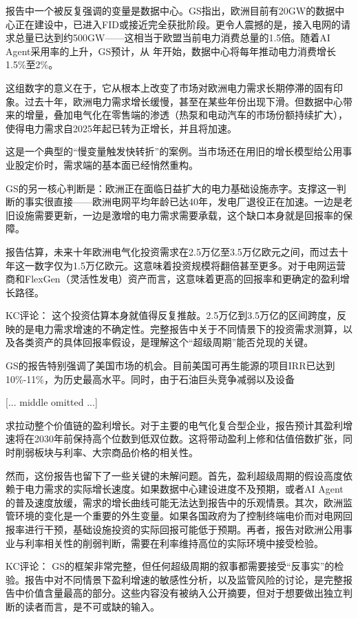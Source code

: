 \documentclass[11pt]{ctexart}
\begin{document}
报告中一个被反复强调的变量是数据中心。GS指出，欧洲目前有20GW的数据中心正在建设中，已进入FID或接近完全获批阶段。更令人震撼的是，接入电网的请求总量已达到约500GW——这相当于欧盟当前电力消费总量的1.5倍。随着AI Agent采用率的上升，GS预计，从 年开始，数据中心将每年推动电力消费增长1.5\%至2\%。

这组数字的意义在于，它从根本上改变了市场对欧洲电力需求长期停滞的固有印象。过去十年，欧洲电力需求增长缓慢，甚至在某些年份出现下滑。但数据中心带来的增量，叠加电气化在零售端的渗透（热泵和电动汽车的市场份额持续扩大），使得电力需求自2025年起已转为正增长，并且将加速。

这是一个典型的“慢变量触发快转折”的案例。当市场还在用旧的增长模型给公用事业股定价时，需求端的基本面已经悄然重构。

GS的另一核心判断是：欧洲正在面临日益扩大的电力基础设施赤字。支撑这一判断的事实很直接——欧洲电网平均年龄已达40年，发电厂退役正在加速。一边是老旧设施需要更新，一边是激增的电力需求需要承载，这个缺口本身就是回报率的保障。

报告估算，未来十年欧洲电气化投资需求在2.5万亿至3.5万亿欧元之间，而过去十年这一数字仅为1.5万亿欧元。这意味着投资规模将翻倍甚至更多。对于电网运营商和FlexGen（灵活性发电）资产而言，这意味着更高的回报率和更确定的盈利增长路径。

KC评论： 这个投资估算本身就值得反复推敲。2.5万亿到3.5万亿的区间跨度，反映的是电力需求增速的不确定性。完整报告中关于不同情景下的投资需求测算，以及各类资产的具体回报率假设，是理解这个“超级周期”能否兑现的关键。

GS的报告特别强调了美国市场的机会。目前美国可再生能源的项目IRR已达到10\%-11\%，为历史最高水平。同时，由于石油巨头竞争减弱以及设备

[... middle omitted ...]

求拉动整个价值链的盈利增长。对于主要的电气化复合型企业，报告预计其盈利增速将在2030年前保持高个位数到低双位数。这将带动盈利上修和估值倍数扩张，同时削弱板块与利率、大宗商品价格的相关性。

然而，这份报告也留下了一些关键的未解问题。首先，盈利超级周期的假设高度依赖于电力需求的实际增长速度。如果数据中心建设进度不及预期，或者AI Agent的普及速度放缓，需求的增长曲线可能无法达到报告中的乐观情景。其次，欧洲监管环境的变化是一个重要的外生变量。如果各国政府为了控制终端电价而对电网回报率进行干预，基础设施投资的实际回报可能低于预期。再者，报告对欧洲公用事业与利率相关性的削弱判断，需要在利率维持高位的实际环境中接受检验。

KC评论： GS的框架非常完整，但任何超级周期的叙事都需要接受“反事实”的检验。报告中对不同情景下盈利增速的敏感性分析，以及监管风险的讨论，是完整报告中价值含量最高的部分。这些内容没有被纳入公开摘要，但对于想要做出独立判断的读者而言，是不可或缺的输入。
\end{document}
